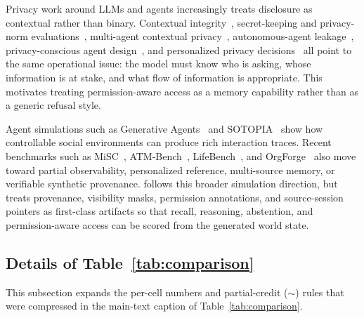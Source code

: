 Privacy work around LLMs and agents increasingly treats disclosure as contextual rather than binary.
Contextual integrity~\citep{nissenbaum2004privacy}, secret-keeping and privacy-norm evaluations~\citep{mireshghallah2024can,privacylens2024,privacybench2024}, multi-agent contextual privacy~\citep{magpie2025}, autonomous-agent leakage~\citep{agentdam2025}, privacy-conscious agent design~\citep{bagdasarian2024airgap}, and personalized privacy decisions~\citep{ariel2025} all point to the same operational issue: the model must know who is asking, whose information is at stake, and what flow of information is appropriate.
This motivates treating permission-aware access as a memory capability rather than as a generic refusal style.

Agent simulations such as Generative Agents~\citep{park2023generative} and SOTOPIA~\citep{zhou2024sotopia} show how controllable social environments can produce rich interaction traces.
Recent benchmarks such as MiSC~\citep{misc2024egocentric}, ATM-Bench~\citep{atmbench2025}, LifeBench~\citep{jiang2026lifebench}, and OrgForge~\citep{orgforge2026} also move toward partial observability, personalized reference, multi-source memory, or verifiable synthetic provenance.
\masim follows this broader simulation direction, but treats provenance, visibility masks, permission annotations, and source-session pointers as first-class artifacts so that recall, reasoning, abstention, and permission-aware access can be scored from the generated world state.

\subsection{Details of Table~\ref{tab:comparison}}
\label{app:tab-comparison-details}

This subsection expands the per-cell numbers and partial-credit ($\sim$) rules that were compressed in the main-text caption of Table~\ref{tab:comparison}.

